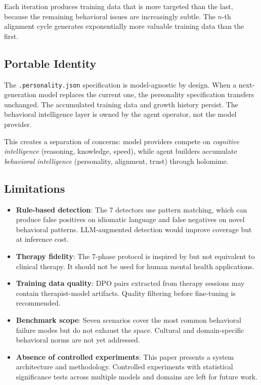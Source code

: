 \documentclass[11pt,a4paper]{article}
\begin{document}
Each iteration produces training data that is more targeted than the last, because the remaining behavioral issues are increasingly subtle. The $n$-th alignment cycle generates exponentially more valuable training data than the first.

\subsection{Portable Identity}

The \texttt{.personality.json} specification is model-agnostic by design. When a next-generation model replaces the current one, the personality specification transfers unchanged. The accumulated training data and growth history persist. The behavioral intelligence layer is owned by the agent operator, not the model provider.

This creates a separation of concerns: model providers compete on \emph{cognitive intelligence} (reasoning, knowledge, speed), while agent builders accumulate \emph{behavioral intelligence} (personality, alignment, trust) through holomime.

\subsection{Limitations}

\begin{itemize}[nosep]
  \item \textbf{Rule-based detection}: The 7 detectors use pattern matching, which can produce false positives on idiomatic language and false negatives on novel behavioral patterns. LLM-augmented detection would improve coverage but at inference cost.
  \item \textbf{Therapy fidelity}: The 7-phase protocol is inspired by but not equivalent to clinical therapy. It should not be used for human mental health applications.
  \item \textbf{Training data quality}: DPO pairs extracted from therapy sessions may contain therapist-model artifacts. Quality filtering before fine-tuning is recommended.
  \item \textbf{Benchmark scope}: Seven scenarios cover the most common behavioral failure modes but do not exhaust the space. Cultural and domain-specific behavioral norms are not yet addressed.
  \item \textbf{Absence of controlled experiments}: This paper presents a system architecture and methodology. Controlled experiments with statistical significance tests across multiple models and domains are left for future work.
\end{itemize}
\end{document}
